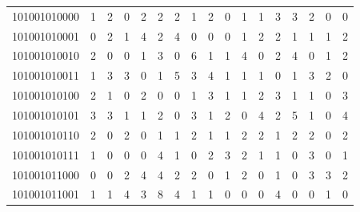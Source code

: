 \documentclass[10pt,a4paper]{article}
\begin{document}
\begin{longtable}{ |c|c|c|c|c|c|c|c|c|c|c|c|c|c|c|c|c| }
    101001010000              & 1                            & 2                                & 0                            & 2                              & 2   & 2   & 1   & 2   & 0   & 1   & 1   & 3   & 3   & 2   & 0   & 0   \\
    101001010001              & 0                            & 2                                & 1                            & 4                              & 2   & 4   & 0   & 0   & 0   & 1   & 2   & 2   & 1   & 1   & 1   & 2   \\
    101001010010              & 2                            & 0                                & 0                            & 1                              & 3   & 0   & 6   & 1   & 1   & 4   & 0   & 2   & 4   & 0   & 1   & 2   \\
    101001010011              & 1                            & 3                                & 3                            & 0                              & 1   & 5   & 3   & 4   & 1   & 1   & 1   & 0   & 1   & 3   & 2   & 0   \\
    101001010100              & 2                            & 1                                & 0                            & 2                              & 0   & 0   & 1   & 3   & 1   & 1   & 2   & 3   & 1   & 1   & 0   & 3   \\
    101001010101              & 3                            & 3                                & 1                            & 1                              & 2   & 0   & 3   & 1   & 2   & 0   & 4   & 2   & 5   & 1   & 0   & 4   \\
    101001010110              & 2                            & 0                                & 2                            & 0                              & 1   & 1   & 2   & 1   & 1   & 2   & 2   & 1   & 2   & 2   & 0   & 2   \\
    101001010111              & 1                            & 0                                & 0                            & 0                              & 4   & 1   & 0   & 2   & 3   & 2   & 1   & 1   & 0   & 3   & 0   & 1   \\
    101001011000              & 0                            & 0                                & 2                            & 4                              & 4   & 2   & 2   & 0   & 1   & 2   & 0   & 1   & 0   & 3   & 3   & 2   \\
    101001011001              & 1                            & 1                                & 4                            & 3                              & 8   & 4   & 1   & 1   & 0   & 0   & 0   & 4   & 0   & 0   & 1   & 0   \\

\end{longtable}
\end{document}
